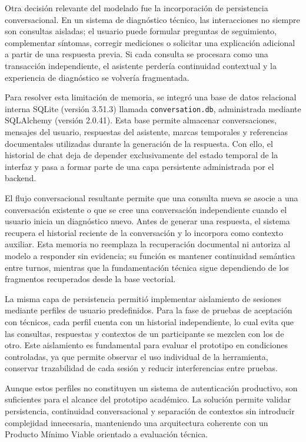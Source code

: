 {{Otra decisión relevante del modelado fue la incorporación de persistencia conversacional. En un sistema de diagnóstico técnico, las interacciones no siempre son consultas aisladas; el usuario puede formular preguntas de seguimiento, complementar síntomas, corregir mediciones o solicitar una explicación adicional a partir de una respuesta previa. Si cada consulta se procesara como una transacción independiente, el asistente perdería continuidad contextual y la experiencia de diagnóstico se volvería fragmentada.

Para resolver esta limitación de memoria, se integró una base de datos relacional interna SQLite (versión 3.51.3) llamada \texttt{conversation.db}, administrada mediante SQLAlchemy (versión 2.0.41). Esta base permite almacenar conversaciones, mensajes del usuario, respuestas del asistente, marcas temporales y referencias documentales utilizadas durante la generación de la respuesta. Con ello, el historial de chat deja de depender exclusivamente del estado temporal de la interfaz y pasa a formar parte de una capa persistente administrada por el backend.

El flujo conversacional resultante permite que una consulta nueva se asocie a una conversación existente o que se cree una conversación independiente cuando el usuario inicia un diagnóstico nuevo. Antes de generar una respuesta, el sistema recupera el historial reciente de la conversación y lo incorpora como contexto auxiliar. Esta memoria no reemplaza la recuperación documental ni autoriza al modelo a responder sin evidencia; su función es mantener continuidad semántica entre turnos, mientras que la fundamentación técnica sigue dependiendo de los fragmentos recuperados desde la base vectorial.

La misma capa de persistencia permitió implementar aislamiento de sesiones mediante perfiles de usuario predefinidos. Para la fase de pruebas de aceptación con técnicos, cada perfil cuenta con un historial independiente, lo cual evita que las consultas, respuestas y contextos de un participante se mezclen con los de otro. Este aislamiento es fundamental para evaluar el prototipo en condiciones controladas, ya que permite observar el uso individual de la herramienta, conservar trazabilidad de cada sesión y reducir interferencias entre pruebas.

Aunque estos perfiles no constituyen un sistema de autenticación productivo, son suficientes para el alcance del prototipo académico. La solución permite validar persistencia, continuidad conversacional y separación de contextos sin introducir complejidad innecesaria, manteniendo una arquitectura coherente con un Producto Mínimo Viable orientado a evaluación técnica.

}}
